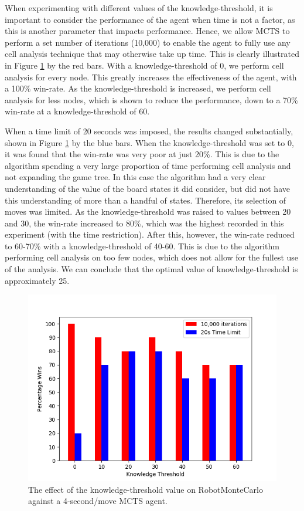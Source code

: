When experimenting with different values of the knowledge-threshold, it is important to consider the performance of the agent when time is not a factor, as this is another parameter that impacts performance. Hence, we allow MCTS to perform a set number of iterations (10,000) to enable the agent to fully use any cell analysis technique that may otherwise take up time. This is clearly illustrated in Figure \ref{fig:mcknowledge_perf} by the red bars. With a knowledge-threshold of 0, we perform cell analysis for every node. This greatly increases the effectiveness of the agent, with a 100\% win-rate. As the knowledge-threshold is increased, we perform cell analysis for less nodes, which is shown to reduce the performance, down to a 70\% win-rate at a knowledge-threshold of 60.

When a time limit of 20 seconds was imposed, the results changed substantially, shown in Figure \ref{fig:mcknowledge_perf} by the blue bars. When the knowledge-threshold was set to 0, it was found that the win-rate was very poor at just 20\%. This is due to the algorithm spending a very large proportion of time performing cell analysis and not expanding the game tree. In this case the algorithm had a very clear understanding of the value of the board states it did consider, but did not have this understanding of more than a handful of states. Therefore, its selection of moves was limited. As the knowledge-threshold was raised to values between 20 and 30, the win-rate increased to 80\%, which was the highest recorded in this experiment (with the time restriction). After this, however, the win-rate reduced to 60-70\% with a knowledge-threshold of 40-60. This is due to the algorithm performing cell analysis on too few nodes, which does not allow for the fullest use of the analysis. We can conclude that the optimal value of knowledge-threshold is approximately 25.


\begin{figure}
    \centering
    \includegraphics[scale = 0.6]{images/MCKNOWLEDGE_PERF.png}
    \caption{The effect of the knowledge-threshold value on RobotMonteCarlo against a 4-second/move MCTS agent.}
    \label{fig:mcknowledge_perf}
\end{figure}







